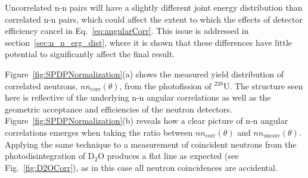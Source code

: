 
Uncorrelated n-n pairs will have a slightly different joint energy distribution than correlated n-n pairs, which could affect the extent to which the effects of detector efficiency cancel in Eq.~\ref{eq:angularCorr}. 
This issue is addressed in section~\ref{sec:n_n_erg_dist}, where it is shown that these differences have little potential to significantly affect the final result.

Figure~\ref{fig:SPDPNormalization}(a) shows the measured yield distribution of correlated neutrons, $nn_{\text{corr}}(\theta)$, from the photofission of $^{238}$U.
The structure seen here is reflective of the underlying n-n angular correlations as well as the geometric acceptance and efficiencies of the neutron detectors.
Figure~\ref{fig:SPDPNormalization}(b) reveals how a clear picture of n-n angular correlations emerges when taking the ratio between $nn_{\text{corr}}(\theta)$ and $nn_{\text{uncorr}}(\theta)$.
Applying the same technique to a measurement of coincident neutrons from the photodisintegration of D$_{2}$O produces a flat line as expected (see Fig.~\ref{fig:D2OCorr}), as in this case all neutron coincidences are accidental.


